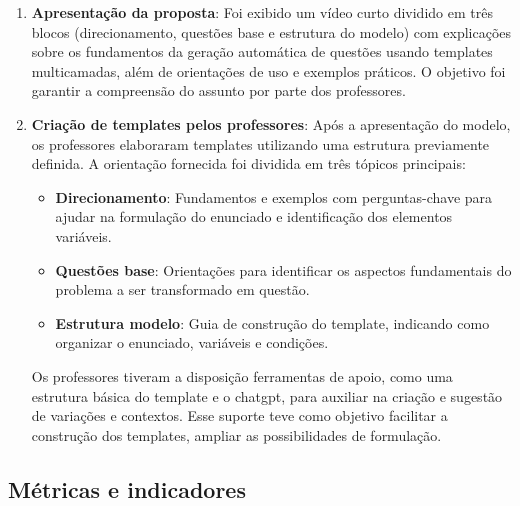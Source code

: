 \begin{enumerate}
    \item \textbf{Apresentação da proposta}: Foi exibido um vídeo curto dividido em três blocos (direcionamento, questões base e estrutura do modelo) com explicações sobre os fundamentos da geração automática de questões usando templates multicamadas, além de orientações de uso e exemplos práticos. O objetivo foi garantir a compreensão do assunto por parte dos professores.

    \item \textbf{Criação de templates pelos professores}: Após a apresentação do modelo, os professores elaboraram templates utilizando uma estrutura previamente definida. A orientação fornecida foi dividida em três tópicos principais:
    \begin{itemize}
        \item \textbf{Direcionamento}: Fundamentos e exemplos com perguntas-chave para ajudar na formulação do enunciado e identificação dos elementos variáveis.
        \item \textbf{Questões base}: Orientações para identificar os aspectos fundamentais do problema a ser transformado em questão.
        \item \textbf{Estrutura modelo}: Guia de construção do template, indicando como organizar o enunciado, variáveis e condições.
    \end{itemize}
    
    Os professores tiveram a disposição ferramentas de apoio, como uma estrutura básica do template e o \gls{chatgpt}, para auxiliar na criação e sugestão de variações e contextos. Esse suporte teve como objetivo facilitar a construção dos templates, ampliar as possibilidades de formulação.
\end{enumerate}


\subsection{Métricas e indicadores}

